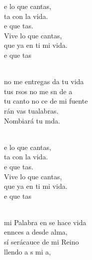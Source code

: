 \documentclass[12pt]{article}
\begin{document}
\begin{multicols*}{2}
\begin{cancion}%
	\begin{chorus}%
	e lo que cantas, \\
	ta con la vida.\\
	e que tas.\\
Vive lo que cantas,\\
	que ya en ti mi vida.\\
	e que tas    \\
	\end{chorus}%
	\jump\\
	no me entregas da tu vida\\
	tus rsos no me sn de a\\
	tu canto no ce de mi fuente\\
	rán vas tualabras.\\
	Nombiará tu mda.\\\jump\\
	\begin{chorus}%
	e lo que cantas, \\
	ta con la vida.\\
	e que tas.\\
Vive lo que cantas,\\
	que ya en ti mi vida.\\
	e que tas    \\
	\end{chorus}%
	\jump\\
	mi Palabra en  se hace vida\\
	ennces a desde alma,\\
	sí serácauce de mi Reino\\
	llendo a s mi a,\\

\end{cancion}
\end{multicols*}
\end{document}
